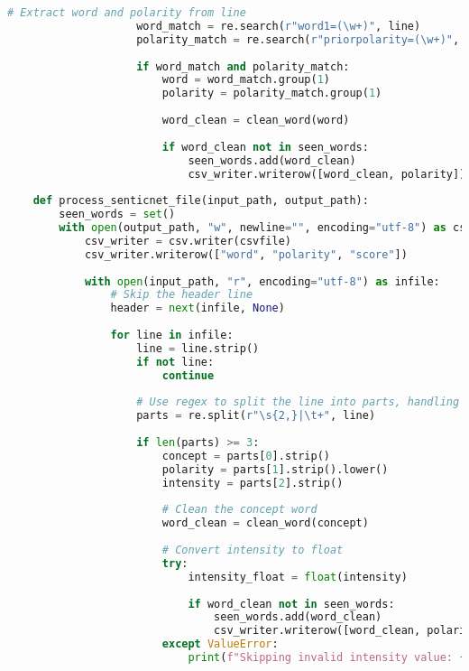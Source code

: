 \documentclass[12pt,letterpaper]{article}
\begin{document}
\begin{lstlisting}[language=Python]
                    # Extract word and polarity from line
                    word_match = re.search(r"word1=(\w+)", line)
                    polarity_match = re.search(r"priorpolarity=(\w+)", line)
    
                    if word_match and polarity_match:
                        word = word_match.group(1)
                        polarity = polarity_match.group(1)
    
                        word_clean = clean_word(word)
    
                        if word_clean not in seen_words:
                            seen_words.add(word_clean)
                            csv_writer.writerow([word_clean, polarity])
    
    def process_senticnet_file(input_path, output_path):
        seen_words = set()
        with open(output_path, "w", newline="", encoding="utf-8") as csvfile:
            csv_writer = csv.writer(csvfile)
            csv_writer.writerow(["word", "polarity", "score"])
    
            with open(input_path, "r", encoding="utf-8") as infile:
                # Skip the header line
                header = next(infile, None)
    
                for line in infile:
                    line = line.strip()
                    if not line:
                        continue
    
                    # Use regex to split the line into parts, handling variable whitespace
                    parts = re.split(r"\s{2,}|\t+", line)
    
                    if len(parts) >= 3:
                        concept = parts[0].strip()
                        polarity = parts[1].strip().lower()
                        intensity = parts[2].strip()
    
                        # Clean the concept word
                        word_clean = clean_word(concept)
    
                        # Convert intensity to float
                        try:
                            intensity_float = float(intensity)
    
                            if word_clean not in seen_words:
                                seen_words.add(word_clean)
                                csv_writer.writerow([word_clean, polarity, intensity_float])
                        except ValueError:
                            print(f"Skipping invalid intensity value: {intensity} for word: {word_clean}")
    \end{lstlisting}
\end{document}
